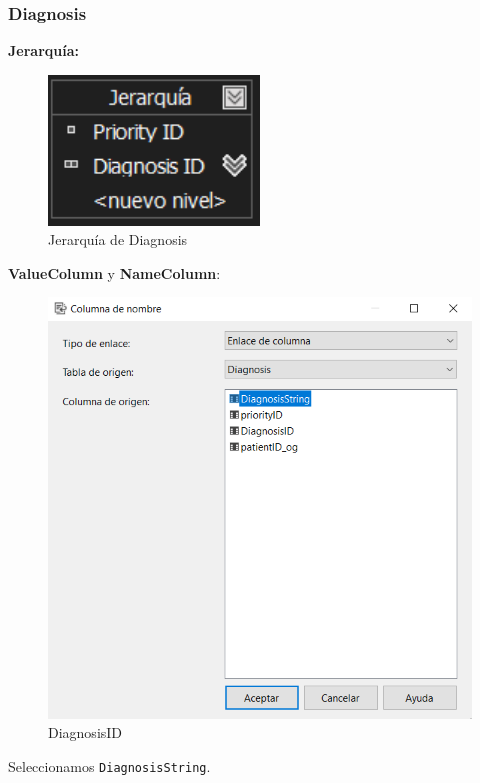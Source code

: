 \documentclass[12pt, a4paper, twoside]{article}
\begin{document}
\subsubsection{Diagnosis}

\textbf{Jerarquía:}

\begin{figure}[H]
	\centering
	\includegraphics[width=0.5\textwidth]{image/JDiagnosis}
	\caption{Jerarquía de Diagnosis}
	\label{fig:20}
\end{figure}

\textbf{ValueColumn} y \textbf{NameColumn}:

\begin{figure}[H]
	\centering
	\includegraphics[width=1\textwidth]{image/DiagnosisID}
	\caption{DiagnosisID}
	\label{fig:21}
\end{figure}

Seleccionamos \texttt{DiagnosisString}.
\end{document}
